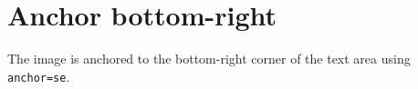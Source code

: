 \documentclass{article}
\begin{document}
\section*{Anchor bottom-right}

The image is anchored to the bottom-right corner of the text area
using \texttt{anchor=se}.

\lipsum[1-5]
\end{document}
